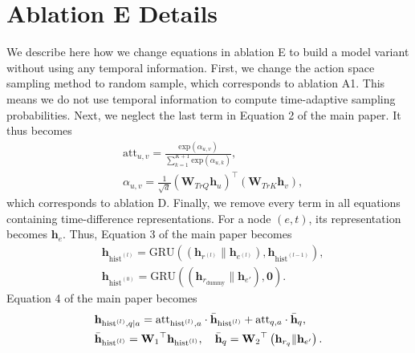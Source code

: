 \documentclass[runningheads]{llncs}
\begin{document}
\section{Ablation E Details}
We describe here how we change equations in ablation E to build a model variant without using any temporal information. First, we change the action space sampling method to random sample, which corresponds to ablation A1. This means we do not use temporal information to compute time-adaptive sampling probabilities. Next, we neglect the last term in Equation 2 of the main paper. It thus becomes
\begin{equation}
\label{eq: time att transformer static}
\begin{aligned}
    &\text{att}_{u,v} = \frac{\text{exp}(\alpha_{u,v})}{\sum_{k=1}^{K+1} \text{exp}(\alpha_{u,k})},\\
    &\alpha_{u,v} = \frac{1}{\sqrt{d}}( \mathbf{W}_{TrQ} \mathbf{h}_u)^\top(\mathbf{W}_{TrK} \mathbf{h}_v),
\end{aligned}    
\end{equation}
which corresponds to ablation D. Finally, we remove every term in all equations containing time-difference representations. For a node $(e,t)$, its representation becomes $\mathbf{h}_e$. Thus, Equation 3 of the main paper becomes
\begin{equation}
\begin{aligned}
        &\mathbf{h}_{\text{hist}^{(l)}} = \text{GRU}\left( \left(\mathbf{h}_{{r}^{(l)}} \| \mathbf{h}_{e^{(l)}}\right),\mathbf{h}_{\text{hist}^{(l-1)}}\right),\\
        &\mathbf{h}_{\text{hist}^{(0)}} = \text{GRU}\left( \left(\mathbf{h}_{{r}_{\text{dummy}}} \| \mathbf{h}_{e'}\right), \mathbf{0}\right).
\end{aligned}
\end{equation}
Equation 4 of the main paper becomes
\begin{equation}
\label{eq: attentional feature static}
\begin{aligned}
        &\mathbf{h}_{\text{hist}^{(l)}, q|a} = \text{att}_{\text{hist}^{(l)}, a} \cdot \Bar{\mathbf{h}}_{\text{hist}^{(l)}} + \text{att}_{q, a} \cdot \Bar{\mathbf{h}}_{q}, \\
        &\Bar{\mathbf{h}}_{\text{hist}^{(l)}} = {\mathbf{W}_1}^\top\mathbf{h}_{\text{hist}^{(l)}}, \quad
        \Bar{\mathbf{h}}_{q} = {\mathbf{W}_2}^\top\left(\mathbf{h}_{r_q}\|\mathbf{h}_{e'}\right).
\end{aligned}
\end{equation}
\end{document}
